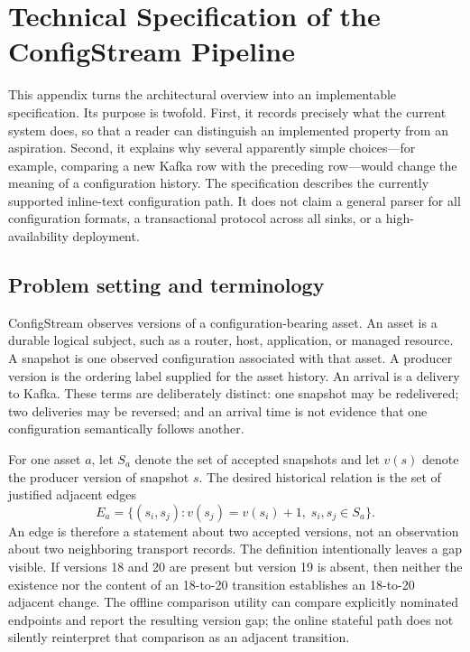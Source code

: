 \documentclass[a4paper,11pt]{article}
\begin{document}
\appendix
\section{Technical Specification of the ConfigStream Pipeline}
\label{app:technical-specification}

This appendix turns the architectural overview into an implementable specification. Its purpose is twofold. First, it records precisely what the current system does, so that a reader can distinguish an implemented property from an aspiration. Second, it explains why several apparently simple choices---for example, comparing a new Kafka row with the preceding row---would change the meaning of a configuration history. The specification describes the currently supported inline-text configuration path. It does not claim a general parser for all configuration formats, a transactional protocol across all sinks, or a high-availability deployment.

\subsection{Problem setting and terminology}

ConfigStream observes versions of a configuration-bearing asset. An asset is a durable logical subject, such as a router, host, application, or managed resource. A snapshot is one observed configuration associated with that asset. A producer version is the ordering label supplied for the asset history. An arrival is a delivery to Kafka. These terms are deliberately distinct: one snapshot may be redelivered; two deliveries may be reversed; and an arrival time is not evidence that one configuration semantically follows another.

For one asset $a$, let $S_a$ denote the set of accepted snapshots and let $v(s)$ denote the producer version of snapshot $s$. The desired historical relation is the set of justified adjacent edges
\[
E_a = \{(s_i,s_j) : v(s_j)=v(s_i)+1,\; s_i,s_j\in S_a\}.
\]
An edge is therefore a statement about two accepted versions, not an observation about two neighboring transport records. The definition intentionally leaves a gap visible. If versions 18 and 20 are present but version 19 is absent, then neither the existence nor the content of an 18-to-20 transition establishes an 18-to-20 adjacent change. The offline comparison utility can compare explicitly nominated endpoints and report the resulting version gap; the online stateful path does not silently reinterpret that comparison as an adjacent transition.
\end{document}
